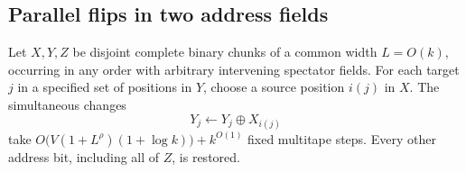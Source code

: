 \subsection{Parallel flips in two address fields}

\begin{lemma}\label{lem:packed-xor}
Let $X,Y,Z$ be disjoint complete binary chunks of a common width
$L=O(k)$, occurring in any order with arbitrary intervening spectator
fields. For each target $j$ in a specified set of positions in $Y$,
choose a source position $i(j)$ in $X$. The simultaneous changes
\[
                 Y_j\longleftarrow Y_j\oplus X_{i(j)}
\]
take $O\bigl(V(1+L^\rho)(1+\log k)\bigr)+k^{O(1)}$ fixed multitape
steps. Every other address bit, including all of $Z$, is restored.
\end{lemma}

